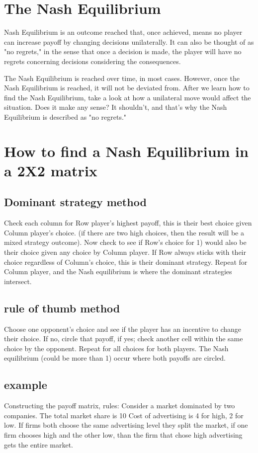 \documentclass[a4paper,12pt]{article}
\begin{document}
\section{The Nash Equilibrium}
Nash Equilibrium is an outcome reached that, once achieved, means no player can increase payoff by changing decisions unilaterally. It can also be thought of as "no regrets," in the sense that once a decision is made, the player will have no regrets concerning decisions considering the consequences.

The Nash Equilibrium is reached over time, in most cases. However, once the Nash Equilibrium is reached, it will not be deviated from. After we learn how to find the Nash Equilibrium, take a look at how a unilateral move would affect the situation. Does it make any sense? It shouldn't, and that's why the Nash Equilibrium is described as "no regrets."

\section{How to find a Nash Equilibrium in a 2X2 matrix}


\subsection{Dominant strategy method}
Check each column for Row player’s highest payoff, this is their best choice given Column player’s choice.  (if there are two high choices, then the result will be a mixed strategy outcome).
Now check to see if Row’s choice for 1) would also be their choice given any choice by Column player.
If Row always sticks with their choice regardless of Column’s choice, this is their dominant strategy.
Repeat for Column player, and the Nash equilibrium is where the dominant strategies intersect.


\subsection{rule of thumb method}
Choose one opponent’s choice and see if the player has an incentive to change their choice. 
If no, circle that payoff, if yes; check another cell within the same choice by the opponent.
Repeat for all choices for both players.
The Nash equilibrium (could be more than 1) occur where both payoffs are circled.
\subsection{example}
Constructing the payoff matrix, rules:
Consider a market dominated by two companies. The total market share is 10
Cost of advertising is 4 for high, 2 for low.
If firms both choose the same advertising level they split the market, if one firm chooses high and the other low, than the firm that chose high advertising gets the entire market.
\end{document}
